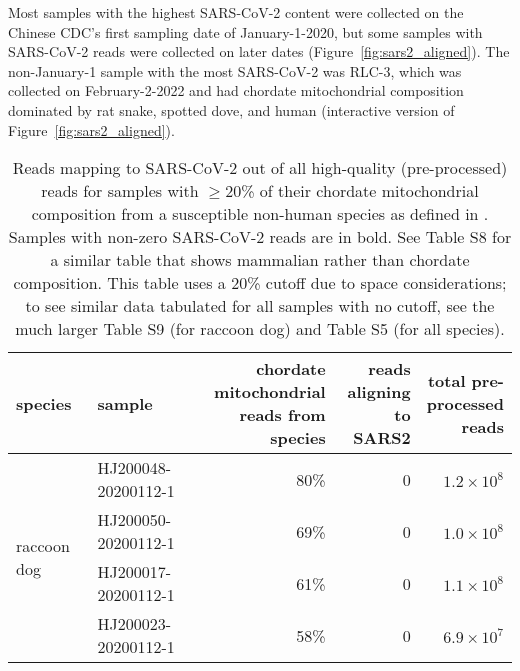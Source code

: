 \documentclass[9pt,twocolumn,twoside]{gsajnl_modified}
\begin{document}
Most samples with the highest SARS-CoV-2 content were collected on the Chinese CDC's first sampling date of January-1-2020, but some samples with SARS-CoV-2 reads were collected on later dates (Figure~\ref{fig:sars2_aligned}).
The non-January-1 sample with the most SARS-CoV-2 was RLC-3, which was collected on February-2-2022 and had chordate mitochondrial composition dominated by rat snake, spotted dove, and human (interactive version of Figure~\ref{fig:sars2_aligned}).

\begin{table}
\caption{
Reads mapping to SARS-CoV-2 out of all high-quality (pre-processed) reads for samples with $\ge$20\% of their chordate mitochondrial composition from a susceptible non-human species as defined in \citet{crits2023genetic}.
Samples with non-zero SARS-CoV-2 reads are in bold.
See Table S8 for a similar table that shows mammalian rather than chordate composition.
This table uses a 20\% cutoff due to space considerations; to see similar data tabulated for all samples with no cutoff, see the much larger Table S9 (for raccoon dog) and Table S5 (for all species).
\label{tab:susceptible}
}
{\scriptsize
\setlength{\tabcolsep}{5pt}
\renewcommand{\arraystretch}{1.3}
\begin{tabular}{llrrr}
\toprule
species      &   sample              & \makecell[r]{chordate \\ mitochondrial \\ reads from \\ species} &  \makecell[r]{reads \\ aligning \\ to SARS2} & \makecell[r]{ total pre-\\processed \\ reads} \\ 
\midrule
\multirow{14}{*}{raccoon dog} & HJ200048-20200112-1 &                                80\% &                        0 &                   $1.2\times 10^8$ \\
                 & HJ200050-20200112-1 &                                69\% &                        0 &                     $1.0 \times 10^8$ \\
                 & HJ200017-20200112-1 &                                61\% &                        0 &                   $1.1 \times 10^8$ \\
                 & HJ200023-20200112-1 &                                58\% &                        0 &                   $6.9 \times 10^7$ \\

\end{tabular}}
\end{table}
\end{document}
